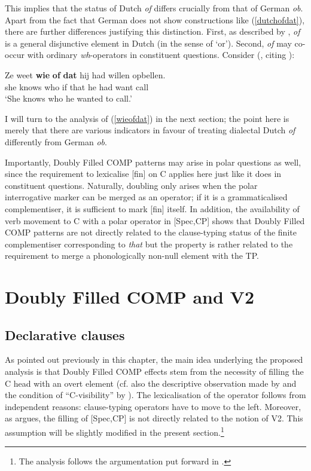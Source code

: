 This implies that the status of Dutch \textit{of} differs crucially from that of German \textit{ob}. Apart from the fact that German does not show constructions like (\ref{dutchofdat}), there are further differences justifying this distinction. First, as described by \citet{boef2013}, \textit{of} is a general disjunctive element in Dutch (in the sense of `or'). Second, \textit{of} may co-occur with ordinary \textit{wh}-operators in constituent questions. Consider (\citealt[66, ex. 17]{bayer2004}, citing \citealt{hoekstra1993}):

\ea \gll Ze weet \textbf{wie} \textbf{of} \textbf{dat} hij had willen opbellen. \label{wieofdat}\\
she knows who if that he had want call\\
\glt `She knows who he wanted to call.'
\z

I will turn to the analysis of (\ref{wieofdat}) in the next section; the point here is merely that there are various indicators in favour of treating dialectal Dutch \textit{of} differently from German \textit{ob}.

Importantly, Doubly Filled COMP patterns may arise in polar questions as well, since the requirement to lexicalise [fin] on C applies here just like it does in constituent questions. Naturally, doubling only arises when the polar interrogative marker can be merged as an operator; if it is a grammaticalised complementiser, it is sufficient to mark [fin] itself. In addition, the availability of verb movement to C with a polar operator in [Spec,CP] shows that Doubly Filled COMP patterns are not directly related to the clause-typing status of the finite complementiser corresponding to \textit{that} but the property is rather related to the requirement to merge a phonologically non-null element with the TP.

\section{Doubly Filled COMP and V2} \label{sec:3doubly}
\subsection{Declarative clauses} \label{sec:3declarative}
As pointed out previously in this chapter, the main idea underlying the proposed analysis is that Doubly Filled COMP effects stem from the necessity of filling the C head with an overt element (cf. also the descriptive observation made by \citealt[85--86]{lenerz1984} and the condition of ``C-visibility'' by \citealt{pittner1995}). The lexicalisation of the operator follows from independent reasons: clause-typing operators have to move to the left. Moreover, as \citet{fanselow2009} argues, the filling of [Spec,CP] is not directly related to the notion of V2. This assumption will be slightly modified in the present section.\footnote{The analysis follows the argumentation put forward in \citet{bacskaiatkari2020jcgl}.}

